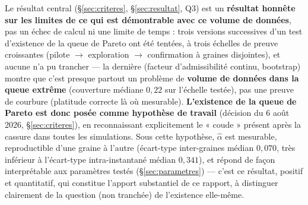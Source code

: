 \documentclass[11pt,a4paper]{article}
\begin{document}
Le résultat central (\S\ref{sec:criteres}, \S\ref{sec:resultat}, Q3) est
un \textbf{résultat honnête sur les limites de ce qui est démontrable
avec ce volume de données}, pas un échec de calcul ni une limite de
temps : trois versions successives d'un test d'existence de la queue de
Pareto ont été tentées, à trois échelles de preuve croissantes (pilote
$\to$ exploration $\to$ confirmation à graines disjointes), et aucune
n'a pu trancher --- la dernière (facteur d'admissibilité continu,
bootstrap) montre que c'est presque partout un problème de
\textbf{volume de données dans la queue extrême} (couverture médiane
$0{,}22$ sur l'échelle testée), pas une preuve de courbure (platitude
correcte là où mesurable). \textbf{L'existence de la queue de Pareto est
donc posée comme hypothèse de travail} (décision du 6 août 2026,
\S\ref{sec:criteres}), en reconnaissant explicitement le « coude »
présent après la cassure dans toutes les simulations. Sous cette
hypothèse, $\hat\alpha$ est mesurable, reproductible d'une graine à
l'autre (écart-type inter-graines médian $0{,}070$, très inférieur à
l'écart-type intra-instantané médian $0{,}341$), et répond de façon
interprétable aux paramètres testés (\S\ref{sec:parametres}) --- c'est
ce résultat, positif et quantitatif, qui constitue l'apport substantiel
de ce rapport, à distinguer clairement de la question (non tranchée) de
l'existence elle-même.
\end{document}
